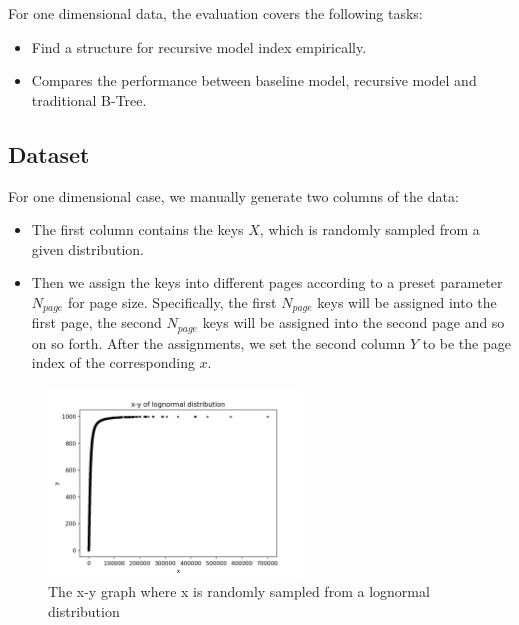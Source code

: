 For one dimensional data, the evaluation covers the following tasks:

\begin{itemize}
	\item Find a structure for recursive model index empirically.
	\item Compares the performance between baseline model, recursive model and traditional B-Tree.
\end{itemize}

\subsection{Dataset}

For one dimensional case, we manually generate two columns of the data:

\begin{itemize}
	\item The first column contains the keys $X$, which is randomly sampled from a given distribution.
	\item Then we assign the keys into different pages according to a preset parameter $N_{page}$ for page size. Specifically, the first $N_{page}$ keys will be assigned into the first page, the second $N_{page}$ keys will be assigned into the second page and so on so forth. After the assignments, we set the second column $Y$ to be the page index of the corresponding $x$.
\end{itemize}


\begin{figure}[htp]
    \centering
    \includegraphics[width=0.6\textwidth]{graphs/evaluation/lognormal_distribution_x_y.pdf}
    \caption{The x-y graph where x is randomly sampled from a lognormal distribution}
    \label{fig:lognormal_x_y}
\end{figure}

